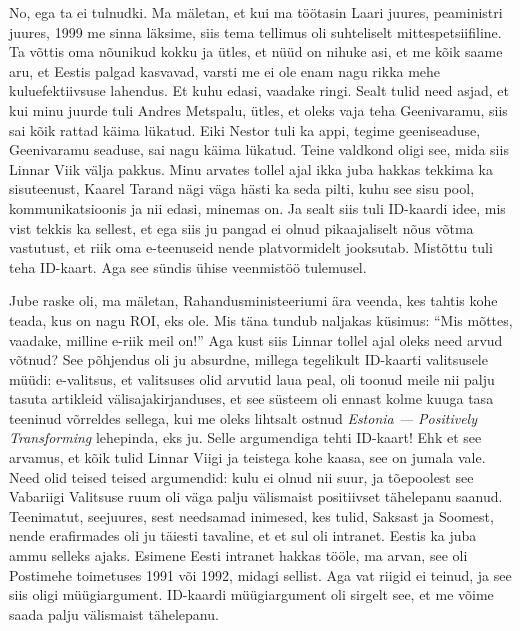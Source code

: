 No, ega ta ei tulnudki. Ma mäletan, et kui ma töötasin Laari juures, peaministri juures, 1999 me sinna läksime, siis tema tellimus oli 
 suhteliselt mittespetsiifiline. Ta võttis oma nõunikud kokku ja ütles, et nüüd 
on nihuke asi, et me kõik saame aru, et Eestis palgad kasvavad, varsti me ei 
ole enam nagu rikka mehe kuluefektiivsuse lahendus. Et kuhu edasi, vaadake 
ringi. Sealt tulid need asjad, et kui minu juurde tuli Andres 
Metspalu, ütles, et oleks vaja teha 
Geenivaramu, siis sai kõik rattad käima lükatud. Eiki 
Nestor tuli ka appi, tegime geeniseaduse, Geenivaramu 
seaduse, sai nagu käima lükatud. Teine valdkond oligi see, mida siis Linnar 
Viik välja pakkus. Minu arvates tollel ajal ikka juba 
hakkas tekkima ka sisuteenust, Kaarel Tarand nägi 
väga hästi ka seda pilti, kuhu see sisu pool, kommunikatsioonis ja nii edasi, 
minemas on. Ja sealt siis tuli ID-kaardi idee, mis vist tekkis ka sellest, et 
ega siis ju pangad ei olnud pikaajaliselt nõus võtma vastutust, et riik oma 
e-teenuseid nende platvormidelt jooksutab. Mistõttu tuli teha ID-kaart. Aga see 
sündis ühise veenmistöö tulemusel. 

Jube raske oli, ma mäletan, Rahandusministeeriumi ära veenda, kes tahtis kohe 
teada, kus on nagu ROI, eks ole. Mis täna tundub naljakas küsimus: \enquote{Mis 
mõttes, vaadake, milline e-riik meil on!} Aga kust siis Linnar tollel ajal oleks need arvud võtnud? See põhjendus oli ju absurdne, 
millega tegelikult ID-kaarti valitsusele müüdi: e-valitsus, et valitsuses olid 
arvutid laua peal, oli toonud meile nii palju tasuta artikleid 
välisajakirjanduses, et see süsteem oli ennast kolme kuuga tasa teeninud 
võrreldes sellega, kui me oleks lihtsalt ostnud \emph{Estonia --- Positively 
Transforming} lehepinda, eks ju. Selle argumendiga 
tehti ID-kaart! Ehk et see arvamus, et kõik tulid  Linnar 
Viigi ja teistega kohe kaasa, see on jumala vale. Need 
olid teised teised argumendid: kulu ei olnud nii suur, ja  tõepoolest see 
Vabariigi Valitsuse ruum oli väga palju välismaist positiivset tähelepanu 
saanud. Teenimatut, seejuures, sest needsamad inimesed, kes tulid, Saksast ja 
Soomest, nende erafirmades oli ju täiesti tavaline, et et sul oli intranet. 
Eestis ka juba ammu selleks ajaks. Esimene Eesti intranet hakkas tööle, ma 
arvan, see oli Postimehe toimetuses 1991 või 1992, midagi 
sellist. Aga vat riigid ei teinud, ja see  siis oligi müügiargument. ID-kaardi 
müügiargument oli sirgelt see, et me võime saada palju välismaist tähelepanu.

